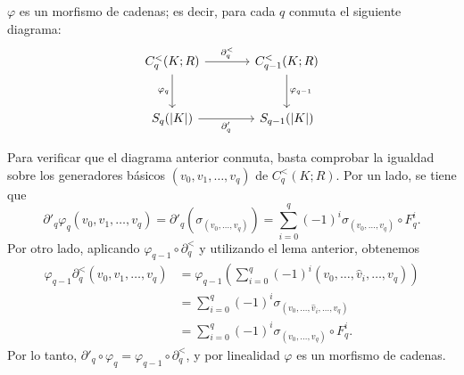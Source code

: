 \begin{prop}
$\varphi$ es un morfismo de cadenas; es decir, para cada $q$ conmuta el siguiente diagrama:
\[
\begin{tikzcd}[row sep=large, column sep=large]
C_q^<(K; R) \arrow[r, "\partial_q^<"] \arrow[d, "\varphi_q"'] & C_{q-1}^<(K; R) \arrow[d, "\varphi_{q-1}"] \\
S_q(|K|) \arrow[r, "\partial'_q"'] & S_{q-1}(|K|)
\end{tikzcd}
\]
\end{prop}

\begin{dem}
Para verificar que el diagrama anterior conmuta, basta comprobar la igualdad sobre los generadores básicos $(v_0, v_1, \dots, v_q)$ de $C_q^<(K; R)$. Por un lado, se tiene que
\[
\partial'_q \varphi_q(v_0, v_1, \dots, v_q) = \partial'_q(\sigma_{(v_0, \dots, v_q)}) = \sum_{i=0}^q (-1)^i \sigma_{(v_0, \dots, v_q)} \circ F_q^i.
\]
Por otro lado, aplicando $\varphi_{q-1} \circ \partial_q^<$ y utilizando el lema anterior, obtenemos
\begin{align*}
\varphi_{q-1} \partial_q^<(v_0, v_1, \dots, v_q) &= \varphi_{q-1}\left( \sum_{i=0}^q (-1)^i (v_0, \dots, \hat{v}_i, \dots, v_q) \right) \\
&= \sum_{i=0}^q (-1)^i \sigma_{(v_0, \dots, \hat{v}_i, \dots, v_q)} \\
&{=} \sum_{i=0}^q (-1)^i \sigma_{(v_0, \dots, v_q)} \circ F_q^i.
\end{align*}
Por lo tanto, $\partial'_q \circ \varphi_q = \varphi_{q-1} \circ \partial_q^<$, y por linealidad $\varphi$ es un morfismo de cadenas.
\end{dem}

